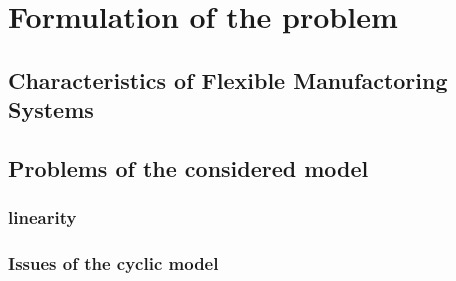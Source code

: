 \documentclass[11pt,a4paper]{report}
\begin{document}
\chapter{Formulation of the problem}
\section{Characteristics of Flexible Manufactoring Systems}
\section{Problems of the considered model}
\subsection{linearity}
\subsection{Issues of the cyclic model}
\end{document}

